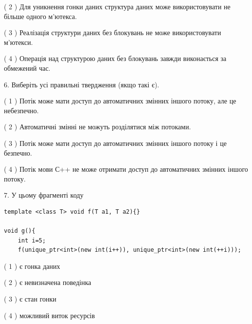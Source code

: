 \documentclass[12pt, ukrainian]{article}
\begin{document}
\begin {large}
{( 2 ) Для уникнення гонки даних структура даних може використовувати не більше одного м’ютекса.%

( 3 ) Реалізація структури даних без блокувань не може використовувати м’ютекси.%

( 4 ) Операція над структурою даних без блокувань завжди виконається за обмежений час.%
\newpage



\vspace{5mm}
6. Виберіть усі правильні твердження (якщо такі є).\par
\vspace{2mm}

( 1 ) Потік може мати доступ до автоматичних змінних іншого потоку, але це небезпечно.%

( 2 ) Автоматичні змінні не можуть розділятися між потоками.%

( 3 ) Потік може мати доступ до автоматичних змінних іншого потоку і це безпечно.%

( 4 ) Потік мови С++ не може отримати доступ до автоматичних змінних іншого потоку.%


\vspace{5mm}
7. У цьому фрагменті коду
\begin{verbatim}
template <class T> void f(T a1, T a2){}

void g(){
    int i=5;
    f(unique_ptr<int>(new int(i++)), unique_ptr<int>(new int(++i)));
\end{verbatim}

( 1 ) є гонка даних%

( 2 ) є невизначена поведінка%

( 3 ) є стан гонки%

( 4 ) можливий виток ресурсів%
}
\end {large}
\end{document}
